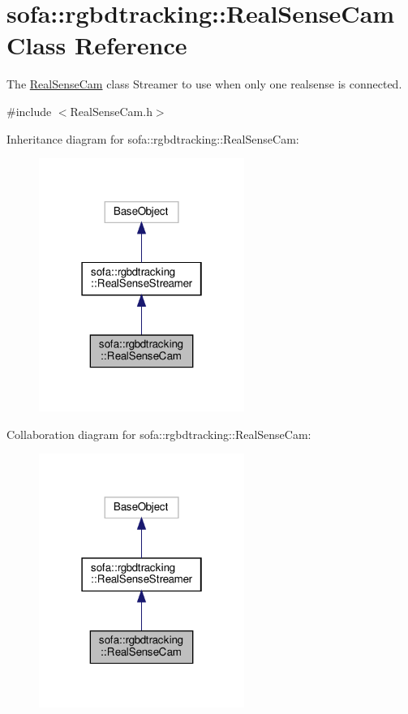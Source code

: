 \hypertarget{classsofa_1_1rgbdtracking_1_1_real_sense_cam}{}\section{sofa\+:\+:rgbdtracking\+:\+:Real\+Sense\+Cam Class Reference}
\label{classsofa_1_1rgbdtracking_1_1_real_sense_cam}


The \hyperlink{classsofa_1_1rgbdtracking_1_1_real_sense_cam}{Real\+Sense\+Cam} class Streamer to use when only one realsense is connected.  




{\ttfamily \#include $<$Real\+Sense\+Cam.\+h$>$}



Inheritance diagram for sofa\+:\+:rgbdtracking\+:\+:Real\+Sense\+Cam\+:
\nopagebreak
\begin{figure}[H]
\begin{center}
\leavevmode
\includegraphics[width=190pt]{classsofa_1_1rgbdtracking_1_1_real_sense_cam__inherit__graph}
\end{center}
\end{figure}


Collaboration diagram for sofa\+:\+:rgbdtracking\+:\+:Real\+Sense\+Cam\+:
\nopagebreak
\begin{figure}[H]
\begin{center}
\leavevmode
\includegraphics[width=190pt]{classsofa_1_1rgbdtracking_1_1_real_sense_cam__coll__graph}
\end{center}
\end{figure}

